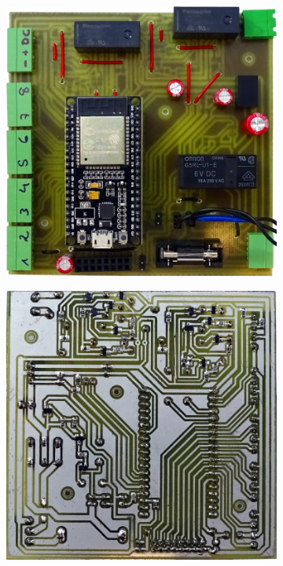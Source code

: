 \begin{figure}[H]
\begin{subfigure}[c]{0.5\linewidth}
	\end{subfigure}
	\begin{subfigure}[c]{0.5\linewidth}
		\centering
		\includegraphics[width=\linewidth]{../../pictures/sensorstation/small/DSC00289.png}	
	\end{subfigure}
	\begin{subfigure}[c]{0.5\linewidth}	
		\includegraphics[width=\linewidth]{../../pictures/sensorstation/small/DSC00290.JPG}		
	\end{subfigure}
\end{figure}
